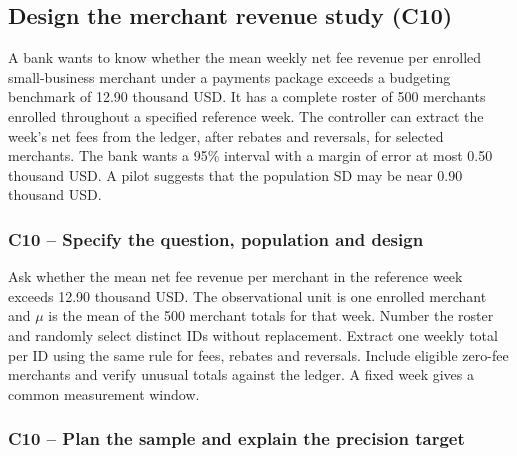 	\subsection{Design the merchant revenue study (C10)}
	\label{prob:c10-1}

	A bank wants to know whether the mean weekly net fee revenue per enrolled small-business merchant under a payments package exceeds a budgeting benchmark of 12.90 thousand USD. It has a complete roster of 500 merchants enrolled throughout a specified reference week. The controller can extract the week's net fees from the ledger, after rebates and reversals, for selected merchants. The bank wants a 95\% interval with a margin of error at most 0.50 thousand USD. A pilot suggests that the population SD may be near 0.90 thousand USD.


	\clearpage

	\label{sol:c10-1-a}
	\subsubsection*{C10 -- Specify the question, population and design}

	Ask whether the mean net fee revenue per merchant in the reference week exceeds 12.90 thousand USD. The observational unit is one enrolled merchant and $\mu$ is the mean of the 500 merchant totals for that week. Number the roster and randomly select distinct IDs without replacement. Extract one weekly total per ID using the same rule for fees, rebates and reversals. Include eligible zero-fee merchants and verify unusual totals against the ledger. A fixed week gives a common measurement window.


	\label{sol:c10-1-b}
	\subsubsection*{C10 -- Plan the sample and explain the precision target}

